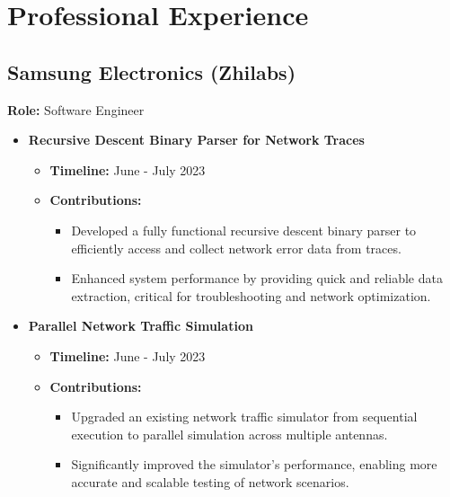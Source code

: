 

\section{Professional Experience}

\subsection{Samsung Electronics (Zhilabs)}
\textbf{Role:} Software Engineer

\begin{itemize}
    \item \textbf{Recursive Descent Binary Parser for Network Traces}
    \begin{itemize}
        \item \textbf{Timeline:} June - July 2023
        \item \textbf{Contributions:}
        \begin{itemize}
            \item Developed a fully functional recursive descent binary parser to efficiently access and collect network error data from traces.
            \item Enhanced system performance by providing quick and reliable data extraction, critical for troubleshooting and network optimization.
        \end{itemize}
    \end{itemize}

    \item \textbf{Parallel Network Traffic Simulation}
    \begin{itemize}
        \item \textbf{Timeline:} June - July 2023
        \item \textbf{Contributions:}
        \begin{itemize}
            \item Upgraded an existing network traffic simulator from sequential execution to parallel simulation across multiple antennas.
            \item Significantly improved the simulator’s performance, enabling more accurate and scalable testing of network scenarios.
        \end{itemize}
    \end{itemize}


\end{itemize}

